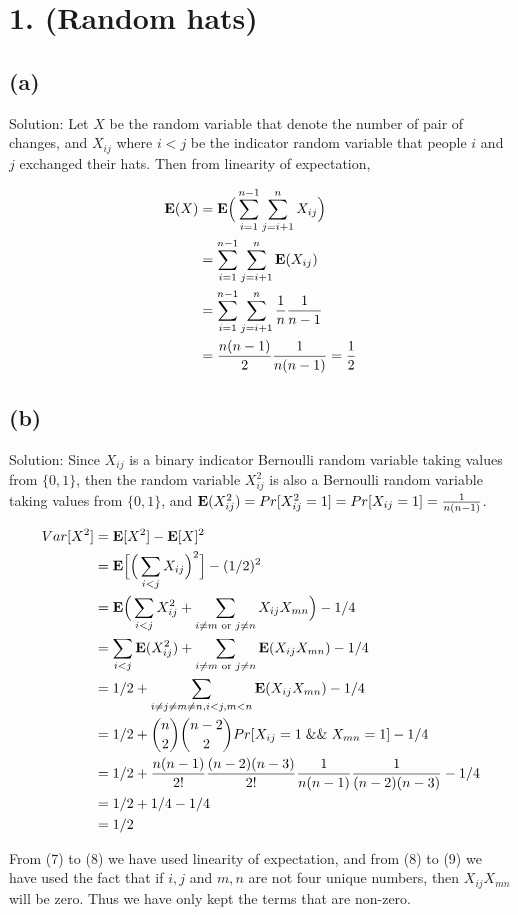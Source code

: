 \documentclass[11pt]{537homework}
\author{Peilun Dai}
\begin{document}
\section*{1. (Random hats) }



\subsection*{(a)} Solution: Let $X$ be the random variable that denote the number of pair of changes, and $X_{ij}$ where $i < j$ be the indicator random variable that people $i$ and $j$ exchanged their hats. Then from linearity of expectation,

\begin{align}
  \mathbf{E}(X)   & = \mathbf{E}\Big(\sum_{i=1}^{n-1} \sum_{j=i+1}^{n} X_{ij}\Big) \\
                  & =  \sum_{i=1}^{n-1} \sum_{j=i+1}^{n} \mathbf{E}(X_{ij}) \\
                  & = \sum_{i=1}^{n-1} \sum_{j=i+1}^{n} {1 \over n}{1\over n-1} \\
                  & = {n(n-1) \over 2}{1 \over n(n-1)} = {1 \over 2}
\end{align}



\subsection*{(b)} Solution: Since $X_{ij}$ is a binary indicator Bernoulli random variable taking values from $\{0, 1\}$, then the random variable $X_{ij}^2$ is also a Bernoulli random variable taking values from $\{0, 1\}$, and $\mathbf{E}(X_{ij}^2) = Pr[X_{ij}^2 = 1] = Pr[X_{ij} = 1] = {1 \over n(n-1)}$. 

\begin{align}
  Var[X^2]  & = \mathbf{E}[X^2] - \mathbf{E}[X]^2 \\
            & = \mathbf{E}\Big[\Big(\sum_{i < j} X_{ij}\Big)^2\Big] - (1/2)^2 \\
            & = \mathbf{E}\Big( \sum_{i<j}X_{ij}^2 + \sum_{i \neq m \text{ or } j \neq n} X_{ij}X_{mn} \Big) - 1/4 \\
            & = \sum_{i<j}\mathbf{E}(X_{ij}^2) + \sum_{i \neq m \text{ or } j \neq n} \mathbf{E}(X_{ij}X_{mn}) - 1/4\\
            & = 1/2 + \sum_{i \neq j \neq m \neq n, i<j, m<n} \mathbf{E}(X_{ij}X_{mn})- 1/4\\
            & = 1/2 + {n \choose 2}{n-2 \choose 2} Pr[X_{ij} = 1 \;\&\&\; X_{mn} = 1] - 1/4\\
            & = 1/2 + {n(n-1) \over 2!} {(n-2)(n-3) \over 2!} {1 \over n(n-1)} {1 \over (n-2)(n-3)} - 1/4\\
            & = 1/2 + 1/4 - 1/4 \\
            & = 1/2
\end{align}

From (7) to (8) we have used linearity of expectation, and from (8) to (9) we have used the fact that if $i, j$ and $m, n$ are not four unique numbers, then $X_{ij}X_{mn}$ will be zero. Thus we have only kept the terms that are non-zero. 
\end{document}
